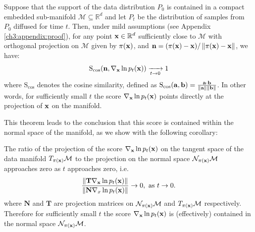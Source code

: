 \begin{theorem}
\label{ch3:thm:score_orthogonal}
Suppose that the support of the data distribution $P_0$ is contained in a compact embedded sub-manifold $\mathcal{M} \subseteq \mathbb{R}^d$ and let $P_t$ be the distribution of samples from $P_0$ diffused for time $t$. Then, under mild assumptions (see Appendix \ref{ch3:appendix:proof}), for any point $\textup{\textbf{x}} \in \mathbb{R}^d$ sufficiently close to $\mathcal{M}$ with orthogonal projection on $\mathcal{M}$ given by $\pi(\textup{\textbf{x}})$, and $\textup{\textbf{n}} = (\pi(\textup{\textbf{x}}) - \textup{\textbf{x}}) / \left\lVert \pi(\textup{\textbf{x}}) - \textup{\textbf{x}} \right\rVert$, we have: 
\begin{gather*}
 \text{S}_{\cos} (\textup{\textbf{n}}, \nabla_\textbf{x} \ln p_t(\textup{\textbf{x}})) \xrightarrow[t \to 0]{} 1
\end{gather*}
where $\text{S}_{\cos}$ denotes the cosine similarity, defined as $\text{S}_{\cos}(\textup{\textbf{a}}, \textup{\textbf{b}}) = \frac{\textup{\textbf{a}} \cdot \textup{\textbf{b}}}{\left\lVert \textup{\textbf{a}} \right\rVert \left\lVert \textup{\textbf{b}} \right\rVert}$. In other words, for sufficiently small $t$ the score $\nabla_\textbf{x} \ln p_t(\textup{\textbf{x}})$ points directly at the projection of $\textup{\textbf{x}}$ on the manifold.
\end{theorem}



This theorem leads to the conclusion that this score is contained within the normal space of the manifold, as we show with the following corollary:
\begin{corollary}
\label{ch3:cor:score_ratio}
The ratio of the projection of the score $\nabla_\textbf{x} \ln p_t(\textup{\textbf{x}})$ on the tangent space of the data manifold $T_{\pi(\textup{\textbf{x}})}\mathcal{M}$ to the projection on the normal space $\mathcal{N}_{\pi(\textup{\textbf{x}})}\mathcal{M}$ approaches zero as $t$ approaches zero, i.e.
\begin{gather*}
\frac{\left\lVert \mathbf{T}\nabla_\textbf{x} \ln p_t(\textup{\textbf{x}}) \right\rVert}{\left\lVert \mathbf{N}\nabla_x \ln p_t(\textup{\textbf{x}}) \right\rVert} \to 0, \text{ as } t \to 0. 
\end{gather*}
where $\mathbf{N}$ and $\mathbf{T}$ are projection matrices on $\mathcal{N}_{\pi(\textup{\textbf{x}})}\mathcal{M}$  and $T_{\pi(\textup{\textbf{x}})}\mathcal{M}$ respectively. Therefore for sufficiently small $t$ the score $\nabla_\textup{\textbf{x}} \ln p_t(\textup{\textbf{x}})$ is (effectively) contained in the normal space  $\mathcal{N}_{\pi(\textup{\textbf{x}})}\mathcal{M}$.
\end{corollary}

